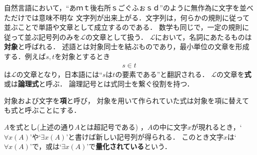 	自然言語において，``あｍｔ後右所ｓごぐふぉｓｄ''のように無作為に文字を並べただけでは意味不明な
	文字列が出来上がる．文字列は，何らかの規則に従って並ぶことで単語や文章として成立するのである．
	数学も同じで，一定の規則に従って並ぶ記号列のみを$\mathcal{L}$の文章として扱う．
	$\mathcal{L}$において，名詞にあたるものは{\bf 対象}と呼ばれる．
	述語とは対象同士を結ぶものであり，最小単位の文章を形成する．例えば$s,t$を対象とするとき
	\begin{align}
		s \in t
	\end{align}
	は$\mathcal{L}$の文章となり，日本語には``$s$は$t$の要素である''と翻訳される．
	$\mathcal{L}$の文章を{\bf 式}或は{\bf 論理式}と呼ぶ．
	論理記号とは式同士を繋ぐ役割を持つ．
	
	
	対象および文字を{\bf 項}と呼び，
	対象を用いて作られていた式は対象を項に替えても式と呼ぶことにする．
	
	$A$を式とし(上述の通り$A$とは超記号である)
	，$A$の中に文字$x$が現れるとき，`$\forall x (A)$'や`$\exists x (A)$'と書けば新しい記号列が得られる．
	このとき文字$x$は`$\forall x (A)$'で，或は`$\exists x (A)$'で{\bf 量化されている}という．
	
